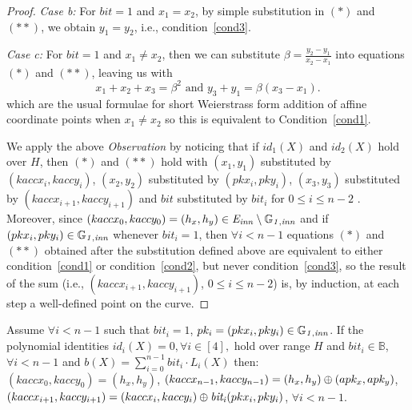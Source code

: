 \begin{proof}
\noindent \textit{Case b:} For $\mathit{bit}=1$ and $x_1=x_2$, by simple substitution in $(\ast)$ and $(\ast \ast)$, 
we obtain $y_1 = y_2$, i.e., condition~\ref{cond3}.  \\
\vspace{-0.1in}

\noindent \textit{Case c:} For $\mathit{bit}=1$ and $x_1 \neq x_2$, then we can substitute
$\beta=\frac{y_2-y_1}{x_2-x_1}$ into equations $(\ast)$ and $(\ast \ast)$, leaving us with
$$x_1+x_2+x_3=\beta^2 \textrm{ and } y_3+y_1=\beta(x_3-x_1).$$
which are the usual formulae for short Weierstrass form addition of affine coordinate points when $x_1 \neq x_2$ 
so this is equivalent to Condition~\ref{cond1}. \\
\vspace{-0.1in}

\noindent We apply the above \textit{Observation} by noticing that if $id_1(X)$ and $id_2(X)$ hold over $H$, 
then $(\ast)$ and $(\ast \ast)$ hold with $(x_1, y_1)$ substituted by $(kaccx_i,kaccy_i)$, $(x_2, y_2)$ 
substituted by $(pkx_i, pky_i)$, $(x_3, y_3)$ substituted by $(kaccx_{i+1},kaccy_{i+1})$ and $\mathit{bit}$ 
substituted by $\mathit{bit}_i$ for $0 \leq i \leq n-2$ %
. Moreover, since $(kaccx_{0}, kaccy_{0}) = (h_x, h_y) \in \mathit{E}_{\mathit{inn}} \setminus \mathbb{G}_{\mathit{1,inn}}$ 
and if $(pkx_i, pky_i) \in \mathbb{G}_{\mathit{1,inn}}$ whenever $\mathit{bit}_i = 1$, then $\forall i < n-1$ 
equations $(\ast)$ and $(\ast \ast)$ obtained after the substitution defined above are equivalent to either 
condition~\ref{cond1} or condition~\ref{cond2}, but never condition~\ref{cond3}, so the result of the sum (i.e., $(kaccx_{i+1}, kaccy_{i+1})$, $0\leq i \leq n-2$) is, 
by induction, at each step a well-defined point on the curve.%
\end{proof}
\vspace{-0.1in}

\begin{corollary} Assume $\forall i < n-1$ 
such that $\mathit{bit}_i = 1$, $pk_i = (pkx_i, pky_i) \in \mathbb{G}_{\mathit{1,inn}}$. 
If the polynomial identities $id_i(X) = 0, \forall i \in [4],$ hold over range $H$ and 
$\mathit{bit_i} \in \mathbb{B}$, $\forall i < n-1$ and $b(X) = \sum_{i=0}^{n-1} \mathit{bit_i} \cdot L_i(X)$
then:  \\
$(kaccx_{0}, kaccy_{0}) = (h_x, h_y)$, 
$(kaccx_{n-1}, kaccy_{n-1}) = (h_x, h_y) \\ \oplus (apk_x, apk_y)$, 
$(kaccx_{i+1}, kaccy_{i+1}) =  (kaccx_{i}, kaccy_{i})\\ \oplus \mathit{bit_i}(pkx_{i}, pky_{i})$, $\forall i < n-1$.
\label{corollary:keys_affine_comm}
\end{corollary}
\vspace{-0.2in}

